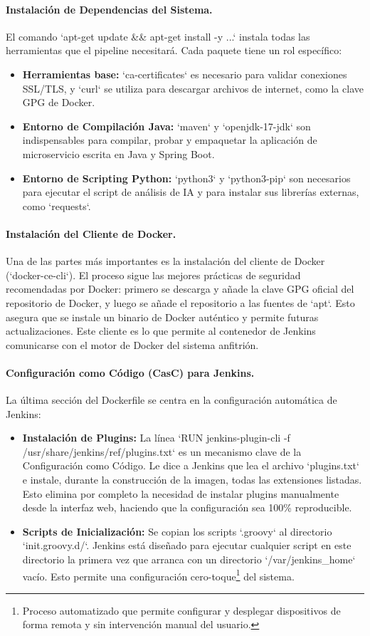 \paragraph{Instalación de Dependencias del Sistema.}
El comando `apt-get update \&& apt-get install -y ...` instala todas las herramientas que el pipeline necesitará. Cada paquete tiene un rol específico:
\begin{itemize}
    \item \textbf{Herramientas base:} `ca-certificates` es necesario para validar conexiones SSL/TLS, y `curl` se utiliza para descargar archivos de internet, como la clave GPG de Docker.
    \item \textbf{Entorno de Compilación Java:} `maven` y `openjdk-17-jdk` son indispensables para compilar, probar y empaquetar la aplicación de microservicio escrita en Java y Spring Boot.
    \item \textbf{Entorno de Scripting Python:} `python3` y `python3-pip` son necesarios para ejecutar el script de análisis de IA y para instalar sus librerías externas, como `requests`.
\end{itemize}

\paragraph{Instalación del Cliente de Docker.}
Una de las partes más importantes es la instalación del cliente de Docker (`docker-ce-cli`). El proceso sigue las mejores prácticas de seguridad recomendadas por Docker: primero se descarga y añade la clave GPG oficial del repositorio de Docker, y luego se añade el repositorio a las fuentes de `apt`. Esto asegura que se instale un binario de Docker auténtico y permite futuras actualizaciones. Este cliente es lo que permite al contenedor de Jenkins comunicarse con el motor de Docker del sistema anfitrión.

\paragraph{Configuración como Código (CasC) para Jenkins.}
La última sección del Dockerfile se centra en la configuración automática de Jenkins:
\begin{itemize}
    \item \textbf{Instalación de Plugins:} La línea `RUN jenkins-plugin-cli -f /usr/share/jenkins/ref/plugins.txt` es un mecanismo clave de la Configuración como Código. Le dice a Jenkins que lea el archivo `plugins.txt` e instale, durante la construcción de la imagen, todas las extensiones listadas. Esto elimina por completo la necesidad de instalar plugins manualmente desde la interfaz web, haciendo que la configuración sea 100\% reproducible.
    \item \textbf{Scripts de Inicialización:} Se copian los scripts `.groovy` al directorio `init.groovy.d/`. Jenkins está diseñado para ejecutar cualquier script en este directorio la primera vez que arranca con un directorio `/var/jenkins\_home` vacío. Esto permite una configuración cero-toque\footnote{Proceso automatizado que permite configurar y desplegar dispositivos de forma remota y sin intervención manual del usuario.} del sistema.
\end{itemize}

